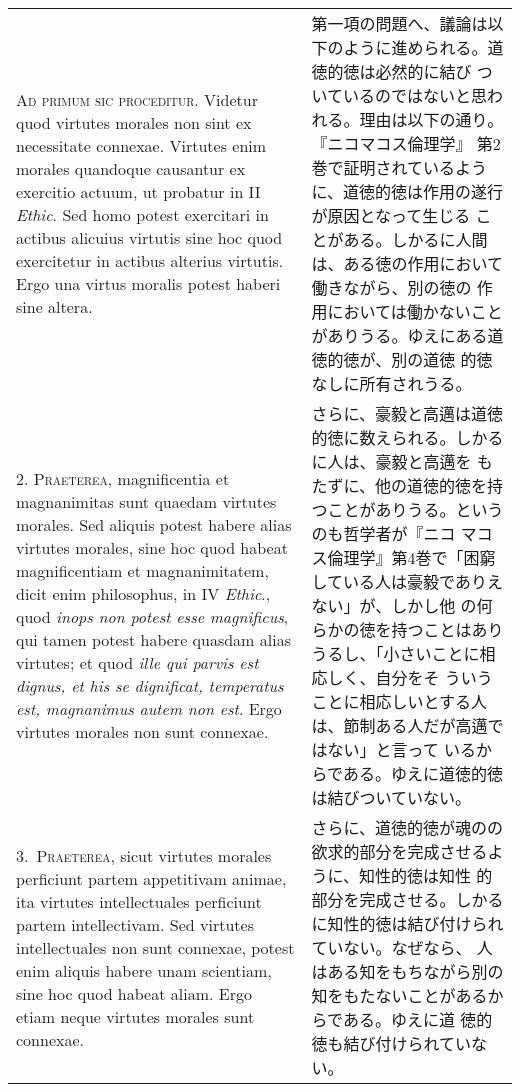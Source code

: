 \documentclass[10pt]{jsarticle}
\begin{document}
\begin{longtable}{p{21em}p{21em}}
{\scshape Ad primum sic proceditur}. Videtur quod virtutes morales non
sint ex necessitate connexae. Virtutes enim morales quandoque
causantur ex exercitio actuum, ut probatur in II {\itshape Ethic}. Sed
homo potest exercitari in actibus alicuius virtutis sine hoc quod
exercitetur in actibus alterius virtutis. Ergo una virtus moralis
potest haberi sine altera.

&

 第一項の問題へ、議論は以下のように進められる。道徳的徳は必然的に結び
 ついているのではないと思われる。理由は以下の通り。『ニコマコス倫理学』
 第2巻で証明されているように、道徳的徳は作用の遂行が原因となって生じる
 ことがある。しかるに人間は、ある徳の作用において働きながら、別の徳の
 作用においては働かないことがありうる。ゆえにある道徳的徳が、別の道徳
 的徳なしに所有されうる。

\\




2. {\scshape Praeterea}, magnificentia et magnanimitas sunt quaedam
virtutes morales. Sed aliquis potest habere alias virtutes morales,
sine hoc quod habeat magnificentiam et magnanimitatem, dicit enim
philosophus, in IV {\itshape Ethic}., quod {\itshape inops non potest
esse magnificus}, qui tamen potest habere quasdam alias virtutes; et
quod {\itshape ille qui parvis est dignus, et his se dignificat,
temperatus est, magnanimus autem non est}. Ergo virtutes morales non
sunt connexae.

&

 さらに、豪毅と高邁は道徳的徳に数えられる。しかるに人は、豪毅と高邁を
 もたずに、他の道徳的徳を持つことがありうる。というのも哲学者が『ニコ
 マコス倫理学』第4巻で「困窮している人は豪毅でありえない」が、しかし他
 の何らかの徳を持つことはありうるし、「小さいことに相応しく、自分をそ
 ういうことに相応しいとする人は、節制ある人だが高邁ではない」と言って
 いるからである。ゆえに道徳的徳は結びついていない。

\\

3.~{\scshape Praeterea}, sicut virtutes morales perficiunt partem
appetitivam animae, ita virtutes intellectuales perficiunt partem
intellectivam. Sed virtutes intellectuales non sunt connexae, potest
enim aliquis habere unam scientiam, sine hoc quod habeat aliam. Ergo
etiam neque virtutes morales sunt connexae.

&

 さらに、道徳的徳が魂のの欲求的部分を完成させるように、知性的徳は知性
 的部分を完成させる。しかるに知性的徳は結び付けられていない。なぜなら、
 人はある知をもちながら別の知をもたないことがあるからである。ゆえに道
 徳的徳も結び付けられていない。


\end{longtable}
\end{document}
